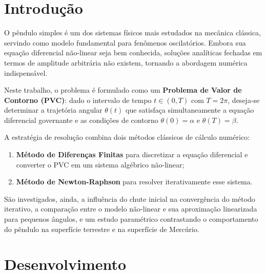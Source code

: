 \documentclass[
  12pt,
  a4paper,
  chapter=TITLE,
  section=TITLE,
  brazil,
  oneside
]{abntex2}
\begin{document}
\imprimircapa

\imprimirfolhaderosto

\tableofcontents
\clearpage

\chapter{Introdução}

O pêndulo simples é um dos sistemas físicos mais estudados na mecânica clássica,
servindo como modelo fundamental para fenômenos oscilatórios. Embora sua equação
diferencial não-linear seja bem conhecida, soluções analíticas fechadas em termos de
amplitude arbitrária não existem, tornando a abordagem numérica indispensável.

Neste trabalho, o problema é formulado como um \textbf{Problema de Valor de Contorno
(PVC)}: dado o intervalo de tempo $t \in (0, T)$ com $T = 2\pi$, deseja-se determinar
a trajetória angular $\theta(t)$ que satisfaça simultaneamente a equação diferencial
governante e as condições de contorno $\theta(0) = \alpha$ e $\theta(T) = \beta$.

A estratégia de resolução combina dois métodos clássicos de cálculo numérico:
\begin{enumerate}
  \item \textbf{Método de Diferenças Finitas} para discretizar a equação diferencial
        e converter o PVC em um sistema algébrico não-linear;
  \item \textbf{Método de Newton-Raphson} para resolver iterativamente esse sistema.
\end{enumerate}

São investigados, ainda, a influência do chute inicial na convergência do método
iterativo, a comparação entre o modelo não-linear e sua aproximação linearizada para
pequenos ângulos, e um estudo paramétrico contrastando o comportamento do pêndulo
na superfície terrestre e na superfície de Mercúrio.

\chapter{Desenvolvimento}
\end{document}
